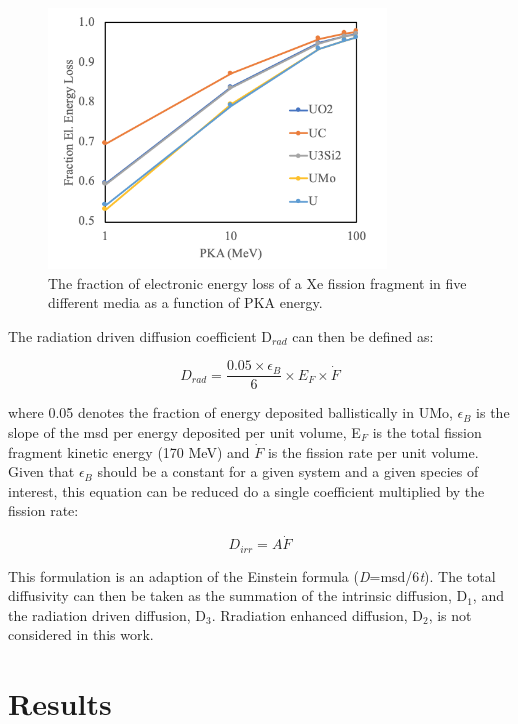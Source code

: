 \documentclass[review]{elsarticle}
\begin{document}
\begin{figure}[h]
 \centering
 \includegraphics[width=0.8\textwidth]{el_energy_loss.png} 
 \caption{The fraction of electronic energy loss of a Xe fission fragment in five different media as a function of PKA energy.}
 \label{fig:eloss}
\end{figure}

The radiation driven diffusion coefficient D$_{rad}$ can then be defined as:

\begin{equation}
\label{eq:1}
D_{rad} = \frac{0.05 \times \epsilon_{B}}{6} \times E_{F} \times \dot F
\end{equation}

where 0.05 denotes the fraction of energy deposited ballistically in UMo, $\epsilon_B$ is the slope of the msd per energy deposited per unit volume, E$_F$ is the total fission fragment kinetic energy (170 MeV) and $\dot F$ is the fission rate per unit volume. Given that $\epsilon_B$ should be a constant for a given system and a given species of interest, this equation can be reduced do a single coefficient multiplied by the fission rate:

\begin{equation}
\label{eq:2}
D_{irr} = A \dot{F} 
\end{equation}

 This formulation is an adaption of the Einstein formula (\textit{D}=msd/6\textit{t}). The total diffusivity can then be taken as the summation of the intrinsic diffusion, D$_1$, and the radiation driven diffusion, D$_3$. Rradiation enhanced diffusion, D$_2$, is not considered in this work.

\FloatBarrier

\section{Results}
\end{document}
